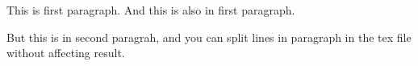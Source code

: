 \documentclass{article}
\begin{document}
    This is first paragraph.
    And this is also in first paragraph.

    But this is in second paragrah, and you
    can split lines in paragraph in the tex
    file without affecting result.
\end{document}
